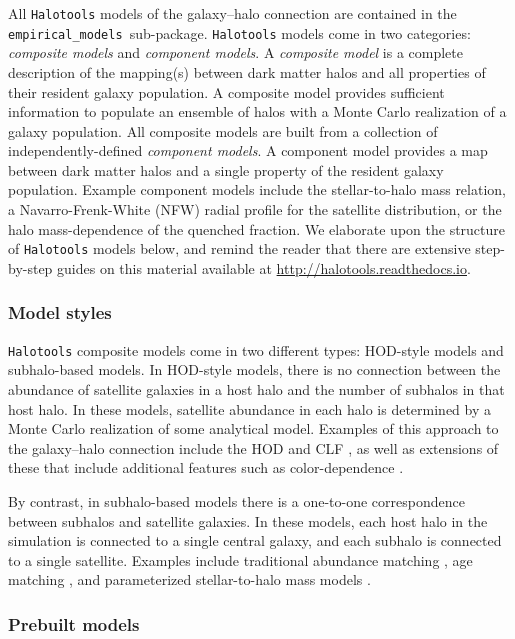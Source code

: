 \documentclass[twocolumn, tighten]{aastex6}
\newcommand{\emodels}{{\tt empirical\_models }}
\begin{document}
All {\tt Halotools} models of the galaxy--halo connection are contained in the \emodels sub-package. {\tt Halotools} models come in two categories: {\em composite models} and {\em component models}. 
A {\em composite model} is a complete description of the mapping(s) between dark matter halos and all properties of their resident galaxy population. A composite model provides sufficient information to populate an ensemble of halos with a Monte Carlo realization of a galaxy population. All composite models are built from a collection of independently-defined {\em component models}. A component model provides a map between dark matter halos and a single property of the resident galaxy population. Example component models include the stellar-to-halo mass relation, a Navarro-Frenk-White (NFW) radial profile for the satellite distribution, or the halo mass-dependence of the quenched fraction. We elaborate upon the structure of {\tt Halotools} models below, and remind the reader that there are extensive step-by-step guides on this material available at \url{http://halotools.readthedocs.io}.

\subsubsection{Model styles}
\label{subsubsection:modelstyles}

{\tt Halotools} composite models come in two different types: HOD-style models and subhalo-based models. In HOD-style models, there is no connection between the abundance of satellite galaxies in a host halo and the number of subhalos in that host halo. In these models, satellite abundance in each halo is determined by a Monte Carlo realization of some analytical model. Examples of this approach to the galaxy--halo connection include the HOD \citep{berlind02} and CLF \citep{yang03}, as well as extensions of these that include additional features such as color-dependence \citep{tinker_etal13}.

By contrast, in subhalo-based models there is a one-to-one correspondence between subhalos and satellite galaxies. In these models, each host halo in the simulation is connected to a single central galaxy, and each subhalo is connected to a single satellite. Examples include traditional abundance matching \citep{kravtsov04a,conroy06}, age matching \citep{HW13a}, and parameterized stellar-to-halo mass models  \citep{behroozi10, moster10}.

\subsubsection{Prebuilt models}
\label{subsubsection:prebuiltmodels}
\end{document}

